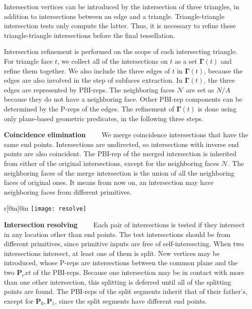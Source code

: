 \label{sec:refine}

Intersection vertices can be introduced by the intersection of three triangles, in addition to intersections between an edge and a triangle. Triangle-triangle intersection tests only compute the latter. Thus, it is necessary to refine these triangle-triangle intersections before the final tessellation.

Intersection refinement is performed on the scope of each intersecting triangle. For triangle face $t$, we collect all of the intersections on $t$ as a set $\bm{\Gamma}(t)$ and refine them together. We also include the three edges of $t$ in $\bm{\Gamma}(t)$, because the edges are also involved in the step of subfaces extraction. In $\bm{\Gamma}(t)$, the three edges are represented by PBI-reps. The neighboring faces $\mathcal{N}$ are set as $N/A$ because they do not have a neighboring face. Other PBI-rep components can be determined by the P-reps of the edges. The refinement of $\bm{\Gamma}(t)$ is done using only plane-based geometric predicates, in the following three steps.


\vspace{0.5em}
\noindent \textbf{Coincidence elimination}~~~~
We merge coincidence intersections that have the same end points. Intersections are undirected, so intersections with inverse end points are also coincident. The PBI-rep of the merged intersection is inherited from either of the original intersections, except for the neighboring faces $\mathcal{N}$. The neighboring faces of the merge intersection is the union of all the neighboring faces of original ones. It means from now on, an intersection may have neighboring faces from different primitives.

\vspace{0.5em}
\begin{wrapfigure}{r}[0in]{0in}
\texttt{[image: resolve]}
\end{wrapfigure}
\noindent\textbf{Intersection resolving}~~~~
Each pair of intersections is tested if they intersect in any location other than end points. The test intersections should be from different primitives, since primitive inputs are free of self-intersecting. When two intersections intersect, at least one of them is split. New vertices may be introduced, whose P-reps are intersections between the common plane and the two $\bm{P}_ext$ of the PBI-reps. Because one intersection may be in contact with more than one other intersection, this splitting is deferred until all of the splitting points are found. The PBI-reps of the split segments inherit that of their father's, except for $\bm{P}_0, \bm{P}_1$, since the split segments have different end points.

